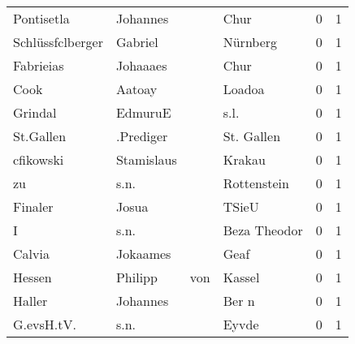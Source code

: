 \begin{tabular}{llllrr}
               Pontisetla &                           Johannes &             &                                        Chur &          0 &         1 \\
         Schlüssfclberger &                            Gabriel &             &                                    Nürnberg &          0 &         1 \\
                Fabrieias &                           Johaaaes &             &                                        Chur &          0 &         1 \\
                     Cook &                             Aatoay &             &                                      Loadoa &          0 &         1 \\
                  Grindal &                            EdmuruE &             &                                        s.l. &          0 &         1 \\
                St.Gallen &                          .Prediger &             &                                  St. Gallen &          0 &         1 \\
                cfikowski &                         Stamislaus &             &                                      Krakau &          0 &         1 \\
                       zu &                               s.n. &             &                                 Rottenstein &          0 &         1 \\
                  Finaler &                              Josua &             &                                       TSieU &          0 &         1 \\
                        I &                               s.n. &             &                                Beza Theodor &          0 &         1 \\
                   Calvia &                           Jokaames &             &                                        Geaf &          0 &         1 \\
                   Hessen &                            Philipp &         von &                                      Kassel &          0 &         1 \\
                   Haller &                           Johannes &             &                                       Ber n &          0 &         1 \\
               G.evsH.tV. &                               s.n. &             &                                       Eyvde &          0 &         1 \\

\end{tabular}
